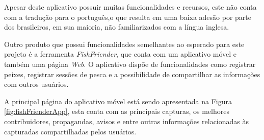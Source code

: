 Apesar deste aplicativo possuir muitas funcionalidades e recursos, este não conta com a tradução para o português,o que resulta em uma baixa adesão por parte dos brasileiros, em sua maioria, não familiarizados com a língua inglesa.

Outro produto que possui funcionalidades semelhantes ao esperado para este projeto é a ferramenta \textit{FishFriender}, que conta com um aplicativo móvel e também uma página \textit{Web}. O aplicativo dispõe de funcionalidades como registrar peixes, registrar sessões de pesca e a possibilidade de compartilhar as informações com outros usuários.

A principal página do aplicativo móvel está sendo apresentada na Figura \ref{fig:fishFrienderApp}, esta conta com as principais capturas, os melhores contribuidores, propagandas, avisos e entre outras informações relacionadas às capturadas compartilhadas pelos usuários.

